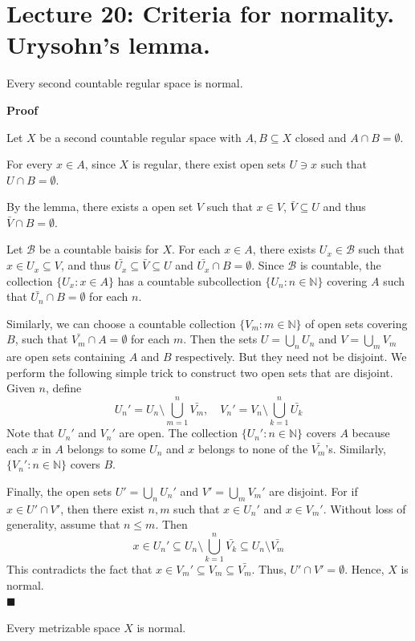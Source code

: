 \documentclass[main.tex]{subfiles}
\begin{document}
\pagestyle{plain}
\setcounter{chapter}{19}

\chapter{Lecture 20: Criteria for normality. Urysohn's lemma. }
\label{chap:chapter20}

\begin{theorem}
    Every second countable regular space is normal.
\end{theorem}
\par \noindent \textbf{Proof} 
\par Let $X$ be a second countable regular space with $A, B \subseteq X$ closed and $A \cap B = \emptyset$.
\par For every $x \in A$, since $X$ is regular, there exist open sets $U\ni x$ such that $U\cap B = \emptyset$. 
\par By the lemma, there exists a open set $V$ such that $x \in V$, $\bar{V} \subseteq U$ and thus $\bar{V} \cap B = \emptyset$. 
\par Let $\mathcal{B}$ be a countable baisis for $X$. For each $x \in A$, there exists $U_x \in \mathcal{B}$ such that $x \in U_x \subseteq V$, and thus $\bar{U_x} \subseteq \bar{V} \subseteq U$ and $\bar{U_x} \cap B = \emptyset$. Since $\mathcal{B}$ is countable, the collection $\{U_x: x \in A\}$ has a countable subcollection $\{U_n: n \in \mathbb{N}\}$ covering $A$ such that $\bar{U_n} \cap B = \emptyset$ for each $n$. 

\par Similarly, we can choose a countable collection $\{V_m: m \in \mathbb{N}\}$ of open sets covering $B$, such that $\bar{V_m} \cap A = \emptyset$ for each $m$. Then the sets $U = \bigcup_{n} U_n$ and $V = \bigcup_{m} V_m$ are open sets containing $A$ and $B$ respectively. But they need not be disjoint. We perform the following simple trick to construct two open sets that are disjoint. Given $n$, define 
\begin{equation}
    U_n' = U_n \setminus \bigcup_{m=1}^{n} \bar{V_m}, \quad V_n' = V_n \setminus \bigcup_{k=1}^{n} \bar{U_k}
\end{equation} 
Note that $U_n'$ and $V_n'$ are open. The collection $\{U_n': n \in \mathbb{N}\}$ covers $A$ because each $x$ in $A$ belongs to some $U_n$ and $x$ belongs to none of the $\bar{V_m}$'s. Similarly, $\{V_n': n \in \mathbb{N}\}$ covers $B$. 
\par Finally, the open sets $U' = \bigcup_n U_n'$ and $V' = \bigcup_m V_m'$ are disjoint. For if $x \in U' \cap V'$, then there exist $n, m$ such that $x \in U_n'$ and $x \in V_m'$. Without loss of generality, assume that $n \leq m$. Then
\begin{equation}
    x \in U_n' \subseteq U_n \setminus \bigcup_{k=1}^{n} \bar{V_k} \subseteq U_n \setminus \bar{V_m}
\end{equation}
This contradicts the fact that $x \in V_m' \subseteq V_m \subseteq \bar{V_m}$. Thus, $U' \cap V' = \emptyset$. Hence, $X$ is normal.
\mbox{} \\ \null \hfill $\blacksquare$ 
\begin{theorem}
    Every metrizable space $X$ is normal.
\end{theorem}
\end{document}
